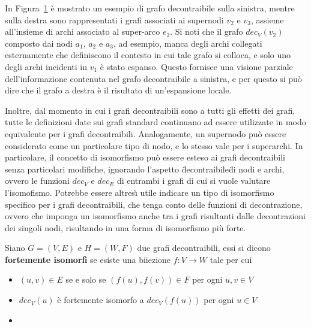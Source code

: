     In Figura~\ref{fig:dec-graph-example} \`e mostrato un esempio di grafo decontraibile sulla sinistra, mentre sulla
    destra sono rappresentati i grafi associati ai supernodi $v_2$ e $v_3$, assieme all'insieme di archi associato
    al super-arco $e_2$.
    Si noti che il grafo $dec_V(v_2)$ composto dai nodi $a_1$, $a_2$ e $a_3$, ad esempio, manca degli archi collegati
    esternamente che definiscono il contesto in cui tale grafo si colloca, e solo uno degli archi incidenti
    in $v_1$ \`e stato espanso.
    Questo fornisce una visione parziale dell'informazione contenuta nel grafo decontraibile a sinistra,
    e per questo si pu\`o dire che il grafo a destra \`e il risultato di un'espansione locale.

    \begin{figure}[H]
      \centering
      
      \label{fig:dec-graph-example}
    \end{figure}

    Inoltre, dal momento in cui i grafi decontraibili sono a tutti gli effetti dei grafi, tutte le
    definizioni date sui grafi standard continuano ad essere utilizzate in modo equivalente per i grafi decontraibili.
    Analogamente, un supernodo pu\`o essere considerato come un particolare tipo di nodo, e lo stesso vale per i
    superarchi.
    In particolare, il concetto di isomorfismo pu\`o essere esteso ai grafi decontraibili senza particolari modifiche,
    ignorando l'aspetto \"decontraibile\" di nodi e archi, ovvero le funzioni $dec_V$ e $dec_E$ di entrambi i grafi
    di cui si vuole valutare l'isomofismo.
    Potrebbe essere altres\`{\i} utile indicare un tipo di isomorfismo specifico per i grafi decontraibili, che tenga
    conto delle funzioni di decontrazione, ovvero che imponga un isomorfismo anche tra i grafi risultanti dalle
    decontrazioni dei singoli nodi, risultando in una forma di isomorfismo pi\`u forte.

    \begin{defintion} \newline
        Siano $G = (V, E)$ e $H = (W, F)$ due grafi decontraibili, essi si dicono \textbf{fortemente isomorfi} se
        esiste una biiezione $f : V \rightarrow W$ tale per cui
        \begin{itemize}
            \item $(u, v) \in E$ se e solo se $(f(u), f(v)) \in F$ per ogni $u, v \in V$
            \item $dec_V(u)$ \`e fortemente isomorfo a $dec_V(f(u))$ per ogni $u \in V$
            \item
        \end{itemize}

    \end{defintion}

